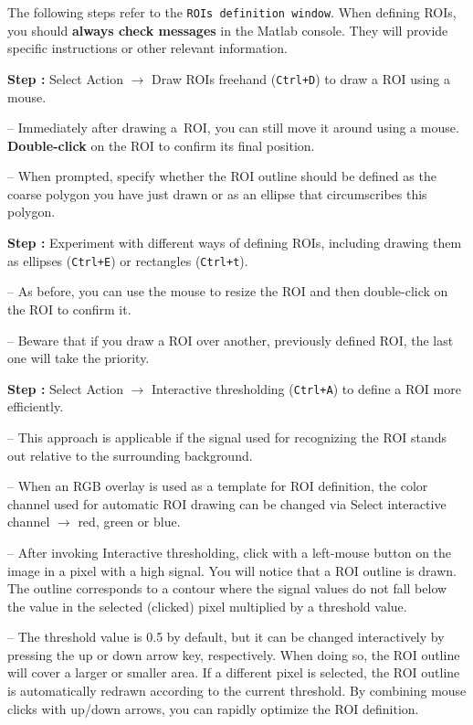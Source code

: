 \documentclass[a4paper, 11pt]{article}
\newcommand{\ttt}[1]{\texttt{#1}}
\newcommand{\lans}[1]{{\color{magenta}#1}}
\newcommand\ra{\rightarrow}
\newcommand\addon[1]{-- {\small #1}}
\newcounter{step}
\newcommand\s{\addtocounter{step}{1}\noindent\textbf{Step \thestep:}{ }}
\newcommand\bb[1]{\textbf{#1}}
\begin{document}
The following steps refer to the \ttt{ROIs definition window}. When defining ROIs, you should \bb{always check messages} in the Matlab console. They will provide specific instructions or other relevant information. 

\setcounter{step}{0}

\s Select \lans{Action} $\ra$ \lans{Draw ROIs freehand} (\ttt{Ctrl+D}) to draw a ROI using a mouse.

\addon{Immediately after drawing a~ROI, you can still move it around using a mouse. \bb{Double-click} on the ROI to confirm its final position.}

\addon{When prompted, specify whether the ROI outline should be defined as the \lans{coarse polygon} you have just drawn or as an \lans{ellipse that circumscribes} this polygon.}

\s Experiment with different ways of defining ROIs, including drawing them as \lans{ellipses} (\ttt{Ctrl+E}) or \lans{rectangles} (\ttt{Ctrl+t}).

\addon{As before, you can use the mouse to resize the ROI and then double-click on the ROI to confirm it.}

\addon{Beware that if you draw a ROI over another, previously defined ROI, the last one will take the priority.}

\s Select \lans{Action} $\ra$ \lans{Interactive thresholding} (\ttt{Ctrl+A}) to define a ROI more efficiently. 

\addon{This approach is applicable if the signal used for recognizing the ROI stands out relative to the surrounding background.}

\addon{When an RGB overlay is used as a template for ROI definition, the color channel used for automatic ROI drawing can be changed via \lans{Select interactive channel} $\ra$ \lans{red}, \lans{green} or \lans{blue}.}

\addon{After invoking \lans{Interactive thresholding}, click with a left-mouse button on the image in a pixel with a high signal. You will notice that a ROI outline is drawn. The outline corresponds to a contour where the signal values do not fall below the value in the selected (clicked) pixel multiplied by a threshold value.}

\addon{The threshold value is 0.5 by default, but it can be changed interactively by pressing the \lans{up} or \lans{down} arrow key, respectively. When doing so, the ROI outline will cover a larger or smaller area. If a different pixel is selected, the ROI outline is automatically redrawn according to the current threshold. By combining mouse clicks with \lans{up}/\lans{down} arrows, you can rapidly optimize the ROI definition.}
\end{document}

